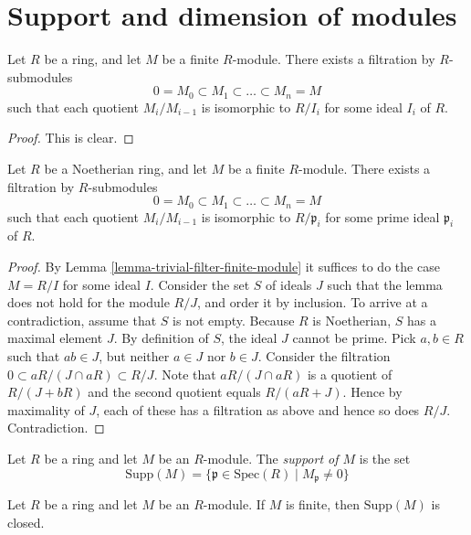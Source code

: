 \section{Support and dimension of modules}
\label{section-support}

\begin{lemma}
\label{lemma-trivial-filter-finite-module}
Let $R$ be a ring, and let $M$ be a finite $R$-module.
There exists a filtration by $R$-submodules
$$
0 = M_0 \subset M_1 \subset \ldots \subset M_n = M
$$
such that each quotient $M_i/M_{i-1}$ is isomorphic
to $R/I_i$ for some ideal $I_i$ of $R$.
\end{lemma}

\begin{proof}
This is clear.
\end{proof}

\begin{lemma}
\label{lemma-filter-Noetherian-module}
Let $R$ be a Noetherian ring, and let $M$ be a finite $R$-module.
There exists a filtration by $R$-submodules
$$
0 = M_0 \subset M_1 \subset \ldots \subset M_n = M
$$
such that each quotient $M_i/M_{i-1}$ is isomorphic
to $R/\mathfrak p_i$ for some prime ideal $\mathfrak p_i$
of $R$.
\end{lemma}

\begin{proof}
By Lemma \ref{lemma-trivial-filter-finite-module}
it suffices to do the case $M = R/I$ for some ideal $I$.
Consider the set $S$ of ideals $J$ such that the lemma
does not hold for the module $R/J$, and order it by
inclusion. To arrive at a
contradiction, assume that $S$ is not empty. Because
$R$ is Noetherian, $S$ has a maximal element $J$.
By definition of $S$, the ideal $J$ cannot be prime.
Pick $a, b\in R$ such that $ab \in J$, but neither
$a \in J$ nor $b\in J$. Consider the filtration
$0 \subset aR/(J \cap aR) \subset R/J$.
Note that $aR/(J \cap aR)$ is a quotient of $R/(J + bR)$
and the second quotient equals $R/(aR + J)$. Hence by
maximality of $J$, each of these has a filtration as
above and hence so does $R/J$. Contradiction.
\end{proof}

\begin{definition}
\label{definition-support-module}
Let $R$ be a ring and let $M$ be an $R$-module.
The {\it support of $M$} is the set
$$
\text{Supp}(M)
=
\{
\mathfrak p \in \text{Spec}(R)
\mid
M_{\mathfrak p} \not= 0
\}
$$
\end{definition}

\begin{lemma}
\label{lemma-support-closed}
Let $R$ be a ring and let $M$ be an $R$-module.
If $M$ is finite, then $\text{Supp}(M)$ is closed.
\end{lemma}

